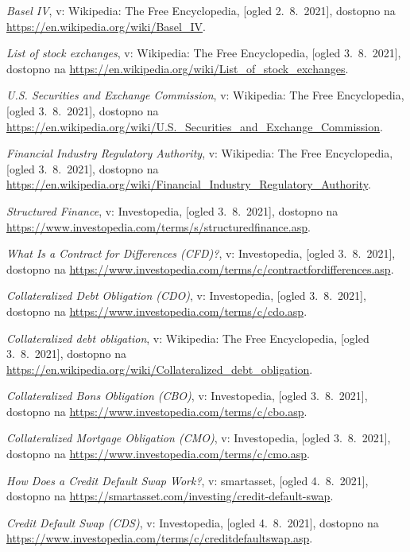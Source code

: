 \documentclass[12pt,a4paper]{amsart}
\theoremstyle{definition} %
\theoremstyle{plain} %
\begin{document}
\begin{thebibliography}{99}
\emph{Basel IV}, v: Wikipedia: The Free Encyclopedia, [ogled 2.~8.~2021], dostopno na \url{https://en.wikipedia.org/wiki/Basel_IV}.

\emph{List of stock exchanges}, v: Wikipedia: The Free Encyclopedia, [ogled 3.~8.~2021], dostopno na \url{https://en.wikipedia.org/wiki/List_of_stock_exchanges}.

\emph{U.S. Securities and Exchange Commission}, v: Wikipedia: The Free Encyclopedia, [ogled 3.~8.~2021], dostopno na \url{https://en.wikipedia.org/wiki/U.S._Securities_and_Exchange_Commission}.

\emph{Financial Industry Regulatory Authority}, v: Wikipedia: The Free Encyclopedia, [ogled 3.~8.~2021], dostopno na \url{https://en.wikipedia.org/wiki/Financial_Industry_Regulatory_Authority}.

\emph{Structured Finance}, v: Investopedia, [ogled 3.~8.~2021], dostopno na \url{https://www.investopedia.com/terms/s/structuredfinance.asp}.

\emph{What Is a Contract for Differences (CFD)?}, v: Investopedia, [ogled 3.~8.~2021], dostopno na \url{https://www.investopedia.com/terms/c/contractfordifferences.asp}.

\emph{Collateralized Debt Obligation (CDO)}, v: Investopedia, [ogled 3.~8.~2021], dostopno na \url{https://www.investopedia.com/terms/c/cdo.asp}.

\emph{Collateralized debt obligation}, v: Wikipedia: The Free Encyclopedia, [ogled 3.~8.~2021], dostopno na \url{https://en.wikipedia.org/wiki/Collateralized_debt_obligation}.

\emph{Collateralized Bons Obligation (CBO)}, v: Investopedia, [ogled 3.~8.~2021], dostopno na \url{https://www.investopedia.com/terms/c/cbo.asp}.

\emph{Collateralized Mortgage Obligation (CMO)}, v: Investopedia, [ogled 3.~8.~2021], dostopno na \url{https://www.investopedia.com/terms/c/cmo.asp}.

\emph{How Does a Credit Default Swap Work?}, v: smartasset, [ogled 4.~8.~2021], dostopno na \url{https://smartasset.com/investing/credit-default-swap}.

\emph{Credit Default Swap (CDS)}, v: Investopedia, [ogled 4.~8.~2021], dostopno na \url{https://www.investopedia.com/terms/c/creditdefaultswap.asp}.


\end{thebibliography}
\end{document}
